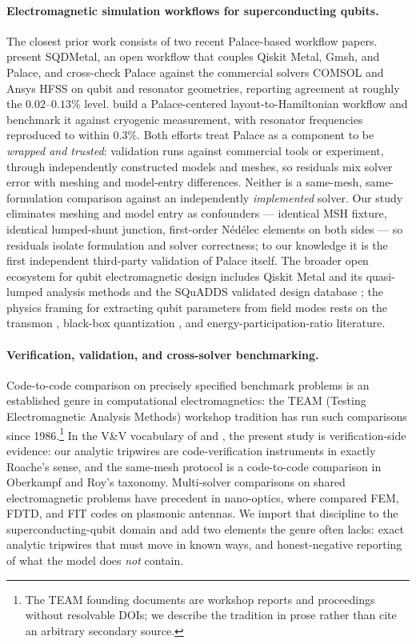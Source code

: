 \documentclass{anvil-paper}
\begin{document}
\paragraph{Electromagnetic simulation workflows for superconducting qubits.}
The closest prior work consists of two recent Palace-based workflow papers.
\citet{sommers2025open} present SQDMetal, an open workflow that couples
Qiskit Metal, Gmsh, and Palace, and cross-check Palace against the
commercial solvers COMSOL and Ansys HFSS on qubit and resonator geometries,
reporting agreement at roughly the $0.02$--$0.13\%$ level.
\citet{ye2025electromagnetic} build a Palace-centered layout-to-Hamiltonian
workflow and benchmark it against cryogenic measurement, with resonator
frequencies reproduced to within $0.3\%$. Both efforts treat Palace as a
component to be \emph{wrapped and trusted}: validation runs against
commercial tools or experiment, through independently constructed models
and meshes, so residuals mix solver error with meshing and model-entry
differences. Neither is a same-mesh, same-formulation comparison against an
independently \emph{implemented} solver. Our study eliminates meshing and
model entry as confounders --- identical MSH fixture, identical lumped-shunt
junction, first-order N\'ed\'elec elements on both sides --- so residuals
isolate formulation and solver correctness; to our knowledge it is the
first independent third-party validation of Palace itself. The broader
open ecosystem for qubit electromagnetic design includes Qiskit Metal and
its quasi-lumped analysis methods \citep{minev2021circuit} and the SQuADDS
validated design database \citep{shanto2024squadds}; the physics framing
for extracting qubit parameters from field modes rests on the transmon
\citep{koch2007}, black-box quantization \citep{nigg2012}, and
energy-participation-ratio \citep{minev2021} literature.

\paragraph{Verification, validation, and cross-solver benchmarking.}
Code-to-code comparison on precisely specified benchmark problems is an
established genre in computational electromagnetics: the TEAM (Testing
Electromagnetic Analysis Methods) workshop tradition has run such
comparisons since 1986.\footnote{The TEAM founding documents are workshop
reports and proceedings without resolvable DOIs; we describe the tradition
in prose rather than cite an arbitrary secondary source.} In the V\&V
vocabulary of \citet{roache1997quantification} and
\citet{oberkampf2010verification}, the present study is
verification-side evidence: our analytic tripwires are code-verification
instruments in exactly Roache's sense, and the same-mesh protocol is a
code-to-code comparison in Oberkampf and Roy's taxonomy. Multi-solver
comparisons on shared electromagnetic problems have precedent in
nano-optics, where \citet{hoffmann2009comparison} compared FEM, FDTD, and
FIT codes on plasmonic antennas. We import that discipline to the
superconducting-qubit domain and add two elements the genre often lacks:
exact analytic tripwires that must move in known ways, and honest-negative
reporting of what the model does \emph{not} contain.
\end{document}
